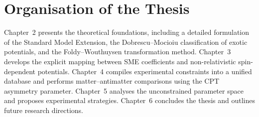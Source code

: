 \documentclass[12pt,a4paper]{report}
\begin{document}
\section{Organisation of the Thesis}

Chapter~2 presents the theoretical foundations, including a detailed
formulation of the Standard Model Extension, the Dobrescu--Mocioiu
classification of exotic potentials, and the Foldy--Wouthuysen transformation
method. Chapter~3 develops the explicit mapping between SME coefficients and
non-relativistic spin-dependent potentials. Chapter~4 compiles experimental
constraints into a unified database and performs matter--antimatter comparisons
using the CPT asymmetry parameter. Chapter~5 analyses the unconstrained
parameter space and proposes experimental strategies. Chapter~6 concludes the
thesis and outlines future research directions.
\end{document}
